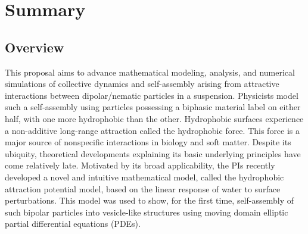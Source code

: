 \documentclass[10pt]{article}
\begin{document}
\section*{Summary}


\subsection*{Overview}
\vspace{-0.1in}
This proposal aims to advance mathematical modeling, analysis, and
numerical simulations of collective dynamics and self-assembly arising
from attractive interactions between dipolar/nematic particles in a
suspension. Physicists model such a self-assembly using particles
possessing a biphasic material label on either half, with one more
hydrophobic than the other. Hydrophobic surfaces experience a
non-additive long-range attraction called the hydrophobic force. This
force is a major source of nonspecific interactions in biology and soft
matter. Despite its ubiquity, theoretical developments explaining its
basic underlying principles have come relatively late. Motivated by its
broad applicability, the PIs recently developed a novel and intuitive
mathematical model, called the hydrophobic attraction potential model,
based on the linear response of water to surface perturbations. This
model was used to show, for the first time, self-assembly of such
bipolar particles into vesicle-like structures using moving domain
elliptic partial differential equations (PDEs).


\end{document}
